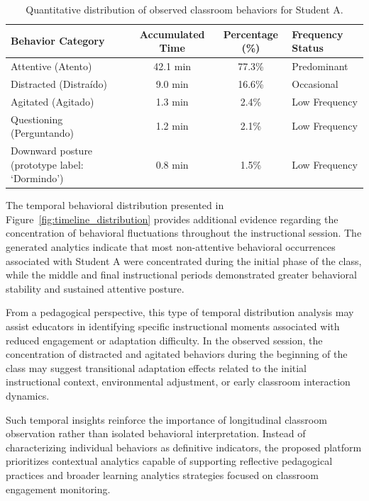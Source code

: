 \documentclass[12pt,a4paper]{article}
\begin{document}
\begin{table}[!htbp]
\centering
\caption{Quantitative distribution of observed classroom behaviors for Student A.}
\label{tab:behavioral_results}
\begin{tabularx}{\textwidth}{@{}>{\raggedright\arraybackslash}p{3.8cm} c c Y@{}}
\toprule
\textbf{Behavior Category} & \textbf{Accumulated Time} & \textbf{Percentage (\%)} & \textbf{Frequency Status} \\ \midrule
Attentive (Atento)         & 42.1 min                 & 77.3\%                  & Predominant               \\
Distracted (Distraído)     & 9.0 min                  & 16.6\%                  & Occasional                \\
Agitated (Agitado)         & 1.3 min                  & 2.4\%                   & Low Frequency             \\
Questioning (Perguntando)  & 1.2 min                  & 2.1\%                   & Low Frequency             \\
Downward posture (prototype label: `Dormindo')      & 0.8 min                  & 1.5\%                   & Low Frequency             \\ \bottomrule
\end{tabularx}
\end{table}

The temporal behavioral distribution presented in Figure~\ref{fig:timeline_distribution} provides additional evidence regarding the concentration of behavioral fluctuations throughout the instructional session. The generated analytics indicate that most non-attentive behavioral occurrences associated with Student A were concentrated during the initial phase of the class, while the middle and final instructional periods demonstrated greater behavioral stability and sustained attentive posture.

From a pedagogical perspective, this type of temporal distribution analysis may assist educators in identifying specific instructional moments associated with reduced engagement or adaptation difficulty. In the observed session, the concentration of distracted and agitated behaviors during the beginning of the class may suggest transitional adaptation effects related to the initial instructional context, environmental adjustment, or early classroom interaction dynamics.

Such temporal insights reinforce the importance of longitudinal classroom observation rather than isolated behavioral interpretation. Instead of characterizing individual behaviors as definitive indicators, the proposed platform prioritizes contextual analytics capable of supporting reflective pedagogical practices and broader learning analytics strategies focused on classroom engagement monitoring.
\end{document}
